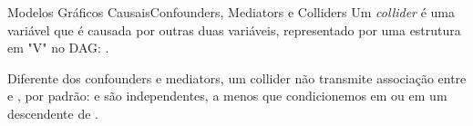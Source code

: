 \begin{frame}{Modelos Gráficos Causais}{Confounders, Mediators e Colliders}
    Um \textit{collider} é uma variável que é causada por outras duas variáveis, representado por uma estrutura em "V" no DAG: .

    Diferente dos confounders e mediators, um collider não transmite associação entre  e , por padrão:  e  são independentes, a menos que condicionemos em  ou em um descendente de .

    \vfill

    \begin{figure}[htbp]
        \centering
        \end{figure}
\end{frame}

